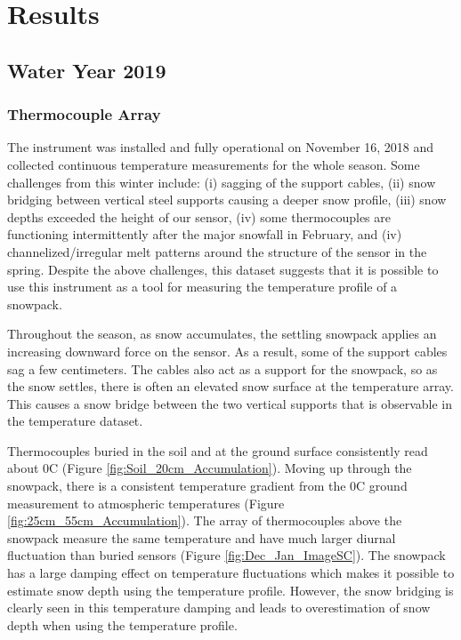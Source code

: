 \chapter{Results}
\section{Water Year 2019} 
\subsection{Thermocouple Array}
The instrument was installed and fully operational on November 16, 2018 and collected continuous temperature measurements for the whole season. Some challenges from this winter include: (i) sagging of the support cables, (ii) snow bridging between vertical steel supports causing a deeper snow profile, (iii) snow depths exceeded the height of our sensor, (iv) some thermocouples are functioning intermittently after the major snowfall in February, and (iv) channelized/irregular melt patterns around the structure of the sensor in the spring. Despite the above challenges, this dataset suggests that it is possible to use this instrument as a tool for measuring the temperature profile of a snowpack. 

Throughout the season, as snow accumulates, the settling snowpack applies an increasing downward force on the sensor. As a result, some of the support cables sag a few centimeters. The cables also act as a support for the snowpack, so as the snow settles, there is often an elevated snow surface at the temperature array. This causes a snow bridge between the two vertical supports that is observable in the temperature dataset.   

Thermocouples buried in the soil and at the ground surface consistently read about 0\textdegree C (Figure \ref{fig:Soil_20cm_Accumulation}). Moving up through the snowpack, there is a consistent temperature gradient from the 0\textdegree C ground measurement to atmospheric temperatures (Figure \ref{fig:25cm_55cm_Accumulation}). The array of thermocouples above the snowpack measure the same temperature and have much larger diurnal fluctuation than buried sensors (Figure \ref{fig:Dec_Jan_ImageSC}). The snowpack has a large damping effect on temperature fluctuations which makes it possible to estimate snow depth using the temperature profile. However, the snow bridging is clearly seen in this temperature damping and leads to overestimation of snow depth when using the temperature profile. 

